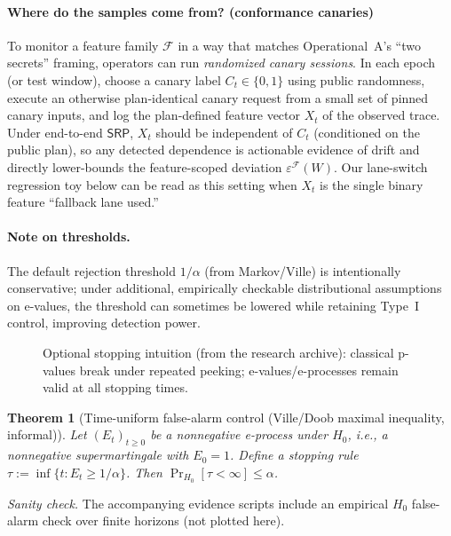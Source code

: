 \documentclass[11pt]{article}
\newtheorem{theorem}{Theorem}
\newcommand{\SRP}{\ensuremath{\mathsf{SRP}}}
\begin{document}
\paragraph{Where do the samples come from? (conformance canaries)}
To monitor a feature family $\mathcal{F}$ in a way that matches Operational~A's ``two secrets'' framing, operators can run \emph{randomized canary sessions}.
In each epoch (or test window), choose a canary label $C_t\in\{0,1\}$ using public randomness, execute an otherwise plan-identical canary request from a small set of pinned canary inputs, and log the plan-defined feature vector $X_t$ of the observed trace.
Under end-to-end \SRP, $X_t$ should be independent of $C_t$ (conditioned on the public plan), so any detected dependence is actionable evidence of drift and directly lower-bounds the feature-scoped deviation $\varepsilon^{\mathcal{F}}(W)$.
Our lane-switch regression toy below can be read as this setting when $X_t$ is the single binary feature ``fallback lane used.''

\paragraph{Note on thresholds.}
The default rejection threshold $1/\alpha$ (from Markov/Ville) is intentionally conservative; under additional, empirically checkable distributional assumptions on e-values, the threshold can sometimes be lowered while retaining Type~I control, improving detection power.\cite{blierWongWangImprovedThresholds2026}

\begin{figure}[t]
  \centering
  \caption{Optional stopping intuition (from the research archive): classical p-values break under repeated peeking; e-values/e-processes remain valid at all stopping times.}
  \label{fig:optional}
\end{figure}

\begin{theorem}[Time-uniform false-alarm control (Ville/Doob maximal inequality, informal)]
Let $(E_t)_{t\ge 0}$ be a nonnegative \emph{e-process} under $H_0$, i.e., a nonnegative supermartingale with $E_0=1$.
Define a stopping rule $\tau := \inf\{t : E_t \ge 1/\alpha\}$.
Then $\Pr_{H_0}[\tau < \infty] \le \alpha$.\cite{villeCollectif1939,ramdasEvaluesEbook2025,howardConfidenceSequencesAOS2021,rufCompositeVille2023,koolenVille2026}
\end{theorem}
\noindent\emph{Sanity check.} The accompanying evidence scripts include an empirical $H_0$ false-alarm check over finite horizons (not plotted here).
\end{document}
